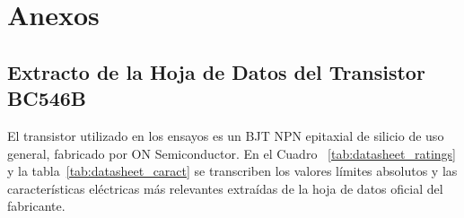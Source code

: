 \chapter{Anexos}
\label{chap:anexos}

\section{Extracto de la Hoja de Datos del Transistor BC546B}

El transistor utilizado en los ensayos es un BJT NPN epitaxial de silicio de uso general, fabricado por ON
Semiconductor. En el Cuadro ~\ref{tab:datasheet_ratings} y la tabla~\ref{tab:datasheet_caract} se transcriben los valores
límites absolutos y las características eléctricas más relevantes extraídas de la hoja de datos oficial del fabricante.

\begin{table}[!ht]
  \centering
  \caption{Límites máximos absolutos de operación del transistor BC546B (ON Semiconductor).}
  \label{tab:datasheet_ratings}
\end{table}

